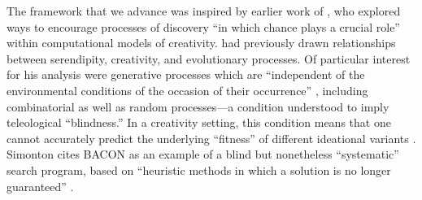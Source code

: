





The framework that we advance was inspired by earlier work of
\citet{pease2013discussion}, who explored ways to encourage
processes of discovery ``in which chance plays a crucial role'' within
computational models of creativity.
\citet{simonton2010creative} had previously drawn relationships
between serendipity, creativity, and evolutionary processes. Of
particular interest for his analysis were generative processes which
are ``independent of the environmental conditions of the occasion of
their occurrence'' \cite{campbell1960blind}, including combinatorial
as well as random processes---a condition understood to imply
teleological ``blindness.''  In a creativity setting, this condition
means that one cannot accurately predict the underlying ``fitness'' of
different ideational variants \cite[p.~159]{simonton2010creative}.
Simonton cites {\sf BACON} \cite{langley1987scientific} as an example
of a blind but nonetheless ``systematic'' search program, based on
``heuristic methods in which a solution is no longer guaranteed''
\cite[p.~169]{simonton2010creative}.

